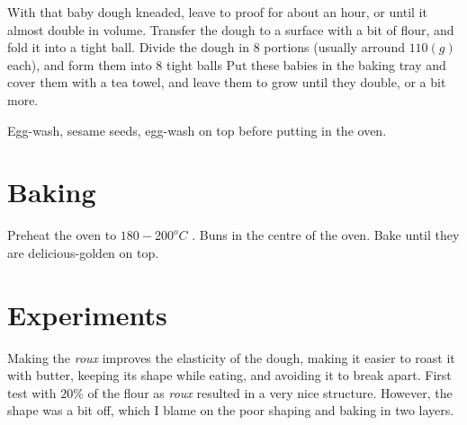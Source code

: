 
With that baby dough kneaded, leave to proof for about an hour, or until it almost double in volume.
%
Transfer the dough to a surface with a bit of flour, and fold it into a tight ball.
%
Divide the dough in $8$ portions (usually arround $110 (g)$ each), and form them into $8$ tight balls
%
Put these babies in the baking tray and cover them with a tea towel, and leave them to grow until they double, or a bit more.

Egg-wash, sesame seeds, egg-wash on top before putting in the oven.

\section{Baking}

Preheat the oven to $180-200^oC$ .
% 
Buns in the centre of the oven.
%
Bake until they are delicious-golden on top.

\section{Experiments}

Making the \textit{roux} improves the elasticity of the dough, making it easier to roast it with butter, keeping its shape while eating, and avoiding it to break apart.
%
First test with $20\%$ of the flour as \textit{roux} resulted in a very nice structure.
%
However, the shape was a bit off, which I blame on the poor shaping and baking in two layers. 



